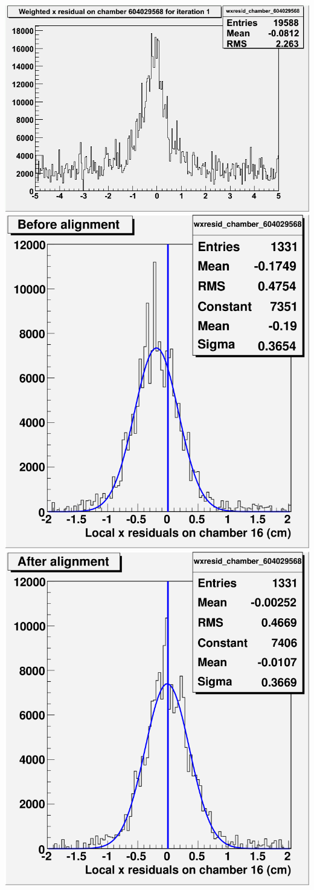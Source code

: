\documentclass[compress]{beamer}
\begin{document}
\begin{frame}
\vspace{0.1 cm}
\includegraphics[height=3.5 cm]{before_cuts.png}
\includegraphics[height=3.5 cm]{before_alignment.png}
\includegraphics[height=3.5 cm]{after_alignment.png}

\end{frame}
\end{document}
